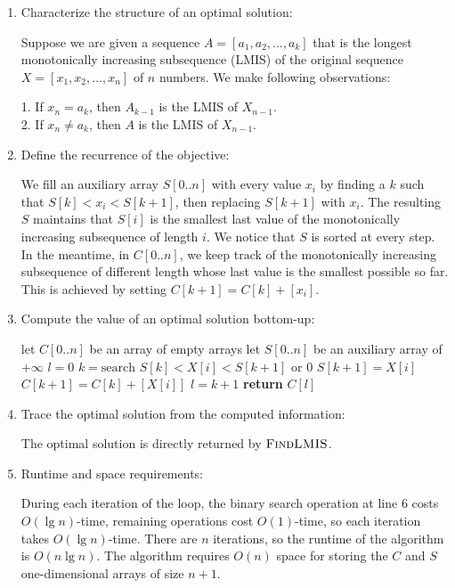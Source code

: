 \documentclass[11pt]{article}
\theoremstyle{definition}
\theoremstyle{theorem}
\begin{document}
\begin{enumerate}[label=(\arabic*)]
\item Characterize the structure of an optimal solution:

Suppose we are given a sequence $A = [a_1, a_2, ..., a_k]$ that is the longest monotonically increasing subsequence (LMIS) of the original sequence $X = [x_1, x_2, ..., x_n]$ of $n$ numbers. We make following observations:

1. If $x_n = a_k$, then $A_{k-1}$ is the LMIS of $X_{n-1}$. \\
2. If $x_n \ne a_k$, then $A$ is the LMIS of $X_{n-1}$.

\item Define the recurrence of the objective:

We fill an auxiliary array $S[0..n]$ with every value $x_i$ by finding a $k$ such that $S[k] < x_i < S[k+1]$, then replacing $S[k+1]$ with $x_i$. The resulting $S$ maintains that $S[i]$ is the smallest last value of the monotonically increasing subsequence of length $i$. We notice that $S$ is sorted at every step. In the meantime, in $C[0..n]$, we keep track of the monotonically increasing subsequence of different length whose last value is the smallest possible so far. This is achieved by setting $C[k+1] = C[k] + [x_i]$.

\item Compute the value of an optimal solution bottom-up:

\begin{algorithmic}[1]
	\State let $C[0..n]$ be an array of empty arrays
	\State let $S[0..n]$ be an auxiliary array of $+\infty$
	\State $l = 0$
		\State $k = \text{search } S[k] < X[i] < S[k+1]$ or $0$ 
		\State $S[k + 1] = X[i]$
		\State $C[k + 1] = C[k] + [X[i]]$
			\State $l = k + 1$ 
		\EndIf
	\EndFor
	\State \textbf{return} $C[l]$
\EndFunction
\end{algorithmic}


\item Trace the optimal solution from the computed information:

The optimal solution is directly returned by $\textproc{\textsc{FindLMIS}}$.

\item Runtime and space requirements:

During each iteration of the loop, the binary search operation at line 6 costs $O(\lg n)$-time, remaining operations cost $O(1)$-time, so each iteration takes $O(\lg n)$-time. There are $n$ iterations, so the runtime of the algorithm is $O(n \lg n)$. The algorithm requires $O(n)$ space for storing the $C$ and $S$ one-dimensional arrays of size $n+1$.

\end{enumerate}
\end{document}
